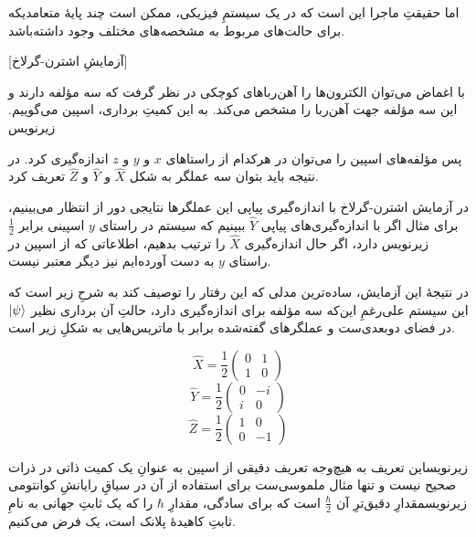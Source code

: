 اما حقیقتِ ماجرا این است که در یک سیستمِ فیزیکی، ممکن است چند پایهٔ متعامدیکه برای  حالت‌های مربوط به مشخصه‌های مختلف وجود داشته‌باشد.

[آزمایشِ اشترن-گرلاخ]


با اغماض می‌توان الکترون‌ها را آهن‌رباهای کوچکی در نظر گرفت که سه مؤلفه دارند و این سه مؤلفه جهت آهن‌ربا را مشخص می‌کند. به این کمیتِ برداری، اسپین می‌گوییم.
‌زیرنویس

پس مؤلفه‌های اسپین را می‌توان در هرکدام از راستاهای \(x\) و \(y\) و \(z\) اندازه‌گیری کرد. در نتیجه باید بتوان سه عملگر به شکل 
\(\hat{X}\)
و 
\(\hat{Y}\)
و 
\(\hat{Z}\)
تعریف کرد.

در آزمایش اشترن-گرلاخ با اندازه‌گیری پیاپی این عملگرها نتایجی دور از انتظار می‌بینیم، برای مثال اگر با اندازه‌گیری‌های پیاپی 
\(\hat{Y}\)
ببینیم که سیستم در راستای \(y\) اسپینی برابر 
\(\frac{1}{2}\)
‌زیرنویس
دارد، اگر حال اندازه‌گیری 
\(\hat{X}\)
را ترتیب بدهیم، اطلاعاتی که از اسپین در راستای \(y\) به دست آورده‌ایم نیز دیگر معتبر نیست.

در نتیجهٔ این آزمایش، ساده‌ترین مدلی که این رفتار را توصیف کند به شرحِ زیر است که این سیستم علی‌رغمِ این‌که سه مؤلفه برای اندازه‌گیری دارد، حالتِ آن برداری نظیر 
\(\ket{\psi}\)
در فضای دوبعدی‌ست و عملگرهای گفته‌شده برابر با ماتریس‌هایی به شکلِ زیر است.

\begin{equation} \hat{X} = \frac{1}{2} \begin{pmatrix} 0 & 1 \\ 1 & 0 \end{pmatrix} \end{equation}
\begin{equation} \hat{Y} = \frac{1}{2} \begin{pmatrix} 0 & -i \\ i & 0 \end{pmatrix} \end{equation}
\begin{equation} \hat{Z} = \frac{1}{2} \begin{pmatrix} 1 & 0 \\ 0 & -1 \end{pmatrix} \end{equation}

‌زیرنویس{این تعریف به هیچ‌وجه تعریف دقیقی از اسپین به عنوانِ یک کمیت ذاتی در ذرات صحیح نیست و تنها مثال ملموسی‌ست برای استفاده از آن در سیاقِ رایانشِ کوانتومی}
‌زیرنویس{مقدارِ دقیق‌ترِ آن 
\(\frac{\hbar}{2}\)
است که برای سادگی، مقدارِ 
\(\hbar\)
را که یک ثابتِ جهانی به نامِ ثابتِ کاهیدهٔ پلانک است، یک فرض می‌کنیم.}

